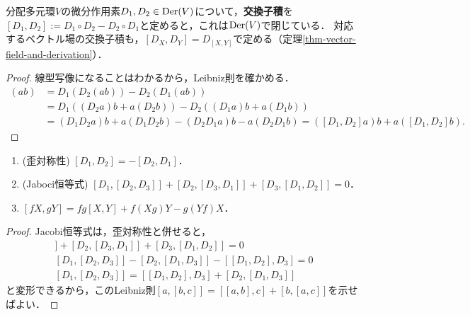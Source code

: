 \documentclass[uplatex,dvipdfmx]{jsreport}
\begin{document}
\begin{definition}
    分配多元環$V$の微分作用素$D_1,D_2\in\mathrm{Der}(V)$について，\textbf{交換子積}を$[D_1,D_2]:=D_1\circ D_2-D_2\circ D_1$と定めると，これは$\mathrm{Der}(V)$で閉じている．
    対応するベクトル場の交換子積も，$[D_X,D_Y]=D_{[X,Y]}$で定める（定理\ref{thm-vector-field-and-derivation}）．
\end{definition}
\begin{proof}
    線型写像になることはわかるから，Leibniz則を確かめる．
    \begin{align*}
        [D_1,D_2](ab)&=D_1(D_2(ab))-D_2(D_1(ab))\\
        &=D_1((D_2a)b+a(D_2b))-D_2((D_1a)b+a(D_1b))\\
        &=(D_1D_2a)b+a(D_1D_2b)-(D_2D_1a)b-a(D_2D_1b)=([D_1,D_2]a)b+a([D_1,D_2]b).
    \end{align*}
\end{proof}

\begin{lemma}[括弧積の性質]\mbox{}
    \begin{enumerate}
        \item (歪対称性) $[D_1,D_2]=-[D_2,D_1]$．
        \item (Jaboci恒等式) $[D_1,[D_2,D_3]]+[D_2,[D_3,D_1]]+[D_3,[D_1,D_2]]=0$．
        \item $[fX,gY]=fg[X,Y]+f(Xg)Y-g(Yf)X$．
    \end{enumerate}
\end{lemma}
\begin{proof}
    Jacobi恒等式は，歪対称性と併せると，
    \begin{align*}
        [D_1,[D_2,D_3]]+[D_2,[D_3,D_1]]+[D_3,[D_1,D_2]]=0\\
        [D_1,[D_2,D_3]]-[D_2,[D_1,D_3]]-[[D_1,D_2],D_3]=0\\
        [D_1,[D_2,D_3]]=[[D_1,D_2],D_3]+[D_2,[D_1,D_3]]
    \end{align*}
    と変形できるから，このLeibniz則$[a,[b,c]]=[[a,b],c]+[b,[a,c]]$を示せばよい．
\end{proof}
\end{document}
